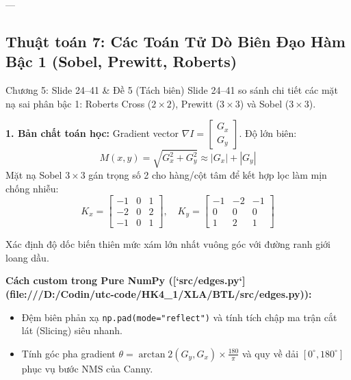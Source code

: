\documentclass[11pt,a4paper]{article}
\begin{document}
---

\subsection{Thuật toán 7: Các Toán Tử Dò Biên Đạo Hàm Bậc 1 (Sobel, Prewitt, Roberts)}
\begin{slidemapping}{Chương 5: Slide 24--41 \& Đề 5 (Tách biên)}
Slide 24--41 so sánh chi tiết các mặt nạ sai phân bậc 1: Roberts Cross ($2 \times 2$), Prewitt ($3 \times 3$) và Sobel ($3 \times 3$).
\end{slidemapping}

\textbf{1. Bản chất toán học:}
Gradient vector $\nabla I = \begin{bmatrix} G_x \\ G_y \end{bmatrix}$. Độ lớn biên:
\begin{equation}
M(x, y) = \sqrt{G_x^2 + G_y^2} \approx |G_x| + |G_y|
\end{equation}
Mặt nạ Sobel $3 \times 3$ gán trọng số 2 cho hàng/cột tâm để kết hợp lọc làm mịn chống nhiễu:
\begin{equation}
K_x = \begin{bmatrix} -1 & 0 & 1 \\ -2 & 0 & 2 \\ -1 & 0 & 1 \end{bmatrix}, \quad K_y = \begin{bmatrix} -1 & -2 & -1 \\ 0 & 0 & 0 \\ 1 & 2 & 1 \end{bmatrix}
\end{equation}

\begin{whyuse}
Xác định độ dốc biến thiên mức xám lớn nhất vuông góc với đường ranh giới loang dầu.
\end{whyuse}

\begin{custombox}
\textbf{Cách custom trong Pure NumPy ([`src/edges.py`](file:///D:/Codin/utc-code/HK4_1/XLA/BTL/src/edges.py)):}
\begin{itemize}
    \item Đệm biên phản xạ \lstinline|np.pad(mode="reflect")| và tính tích chập ma trận cắt lát (Slicing) siêu nhanh.
    \item Tính góc pha gradient $\theta = \arctan2(G_y, G_x) \times \frac{180}{\pi}$ và quy về dải $[0^\circ, 180^\circ]$ phục vụ bước NMS của Canny.
\end{itemize}
\end{custombox}
\end{document}
